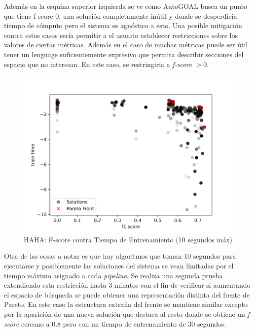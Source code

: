Adem\'as en la esquina superior izquierda se ve como AutoGOAL busca un punto que tiene f-score 0, una soluci\'on completamente in\'util y donde se desperdicia tiempo de c\'omputo pero el sistema es agn\'ostico a esto. Una posible mitigaci\'on contra estos casos ser\'ia permitir a el usuario establecer restricciones sobre los valores de ciertas m\'etricas. Adem\'as en el caso de muchas m\'etricas puede ser \'util  tener un lenguage suficientemente expresivo que permita describir secciones del espacio que no interesan. En este caso, se restringiria a \textit{f-score} $> 0$.

\begin{figure}[ht]
    \centering
    \includegraphics[scale=0.65]{Pictures/haha_fscore_vs_time.jpg}
    \caption{HAHA: F-score contra Tiempo de Entrenamiento (10 segundos m\'ax)}
    \label{impl:fig:haha:fscore_vs_time}
\end{figure}

Otra de las cosas a notar es que hay algoritmos que toman 10 segundos para ejecutarse y posiblemente las soluciones del sistema se vean l\'imitadas por el tiempo m\'aximo asignado a cada \textit{pipeline}. Se realiza una segunda prueba extendiendo esta restricci\'on hasta 3 minutos con el fin de verificar si aumentando el espacio de b\'usqueda se puede obtener una representaci\'on distinta del frente de Pareto. En este caso la estructura extra\~na del frente se mantiene similar excepto por la aparici\'on de una nueva soluci\'on que destaca al resto donde se obtiene un \textit{f-score} cercano a 0.8 pero con un tiempo de entrenamiento de 30 segundos.

